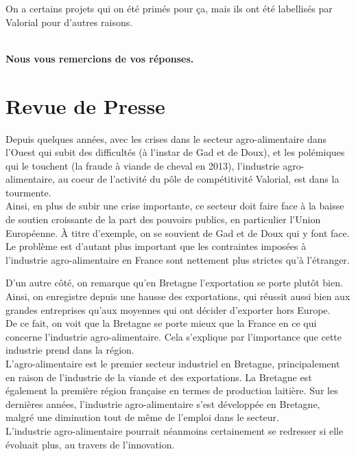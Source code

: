 \documentclass[a4paper,12pt]{report}
\begin{document}
    On a certains projets qui on été primés pour ça, mais ils ont été labellisés par Valorial pour d’autres raisons.

	\textbf{\\Nous vous remercions de vos réponses.}


\chapter{Revue de Presse}
\label{RevuePresse}

	Depuis quelques années, avec les crises dans le secteur agro-alimentaire dans l’Ouest qui subit des difficultés (à l’instar de Gad et de Doux), et les polémiques qui le touchent (la fraude à viande de cheval en 2013), l’industrie agro-alimentaire, au coeur de l’activité du pôle de compétitivité Valorial, est dans la tourmente.\\

	Ainsi, en plus de subir une crise importante, ce secteur doit faire face à la baisse de soutien croissante de la part des pouvoirs publics, en particulier l’Union Européenne. À titre d’exemple, on se souvient de Gad et de Doux qui y font face. Le problème est d’autant plus important que les contraintes imposées à l’industrie agro-alimentaire en France sont nettement plus strictes qu’à l’étranger.
	
	D’un autre côté, on remarque qu’en Bretagne l’exportation se porte plutôt bien. Ainsi, on enregistre depuis une hausse des exportations, qui réussit aussi bien aux grandes entreprises qu’aux moyennes qui ont décider d’exporter hors Europe.\\

	De ce fait, on voit que la Bretagne se porte mieux que la France en ce qui concerne l’industrie agro-alimentaire. Cela s’explique par l’importance que cette industrie prend dans la région.\\

	L’agro-alimentaire est le premier secteur industriel en Bretagne, principalement en raison de l’industrie de la viande et des exportations. La Bretagne est également la première région française en termes de production laitière. Sur les dernières années, l’industrie agro-alimentaire s’est développée en Bretagne, malgré une diminution tout de même de l’emploi dans le secteur.\\

	L’industrie agro-alimentaire pourrait néanmoins certainement se redresser si elle évoluait plus, au travers de l’innovation.\\
\end{document}
